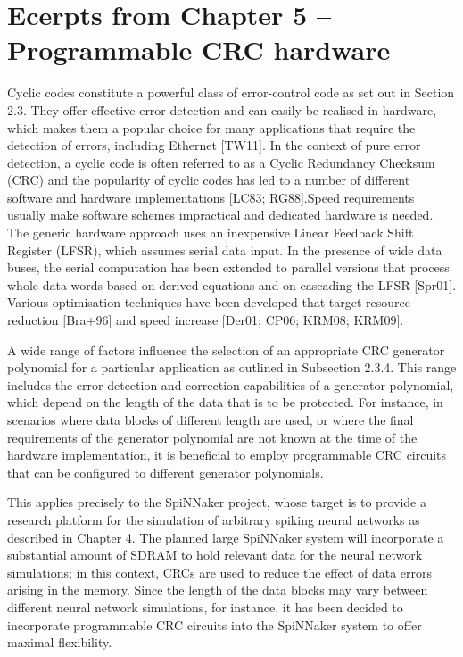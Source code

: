 \documentclass[oneside, a4paper, 11pt]{memoir}
\begin{document}
\newpage
\section{Ecerpts from Chapter 5 -- Programmable CRC hardware}
Cyclic codes constitute a powerful class of error-control code as set out in Section 2.3. They offer effective error detection and can easily be realised in hardware, which makes them a popular choice for many applications that require the detection of errors, including Ethernet [TW11]. In the context of pure error detection, a cyclic code is often referred to as a Cyclic Redundancy Checksum (CRC) and the popularity of cyclic codes has led to a number of different software and hardware implementations [LC83; RG88].Speed requirements usually make software schemes impractical and dedicated hardware is needed. The generic hardware approach uses an inexpensive Linear Feedback Shift Register (LFSR), which assumes serial data input. In the presence of wide data buses, the serial computation has been extended to parallel versions that process whole data words based on derived equations and on cascading the LFSR [Spr01]. Various optimisation techniques have been developed that target resource reduction [Bra+96] and speed increase [Der01; CP06; KRM08; KRM09].

A wide range of factors influence the selection of an appropriate CRC generator polynomial for a particular application as outlined in Subsection 2.3.4. This range includes the error detection and correction capabilities of a generator polynomial, which depend on the length of the data that is to be protected. For instance, in scenarios where data blocks of different length are used, or where the final requirements of the generator polynomial are not known at the time of the hardware implementation, it is beneficial to employ programmable CRC circuits that can be configured to different generator polynomials.

This applies precisely to the SpiNNaker project, whose target is to provide a research platform for the simulation of arbitrary spiking neural networks as described in Chapter 4. The planned large SpiNNaker system will incorporate a substantial amount of SDRAM to hold relevant data for the neural network simulations; in this context, CRCs are used to reduce the effect of data errors arising in the memory. Since the length of the data blocks may vary between different neural network simulations, for instance, it has been decided to incorporate programmable CRC circuits into the SpiNNaker system to offer maximal flexibility.
\end{document}
